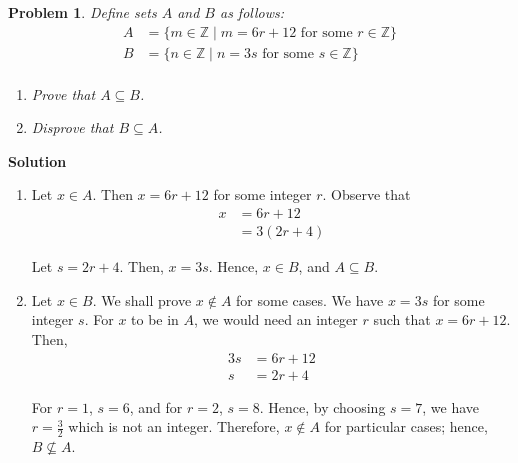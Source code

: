 \documentclass{article}
\newtheorem{problem}{Problem}
\newcommand{\Z}{\mathbb{Z}}
\begin{document}
\begin{problem}
Define sets $A$ and $B$ as follows:
\begin{align*}
A&=\{m \in \Z \mid m=6r+12 \text{ for some } r \in \Z\}\\
B&=\{n \in \Z \mid n=3s \text{ for some } s \in \Z\}\\
\end{align*}

\begin{enumerate}[label=(\alph*)]
\item Prove that $A \subseteq B$.
\item Disprove that $B \subseteq A$.
\end{enumerate}
\end{problem}
\textbf{Solution}
\begin{enumerate}[label=(\alph*)]
\item Let $x \in A$. Then $x=6r+12$ for some integer $r$.
Observe that
\begin{align*}
x&=6r+12\\
&=3(2r+4)
\end{align*}

Let $s=2r+4$. Then, $x=3s$. Hence, $x \in B$, and $A \subseteq B$.
\item Let $x \in B$. We shall prove $x \notin A$ for some cases. We have $x=3s$
for some integer $s$. For $x$ to be in $A$, we would need an integer $r$ such that
$x=6r+12$. Then,
\begin{align*}
3s&=6r+12\\
s&=2r+4
\end{align*}

For $r=1$, $s=6$, and for $r=2$, $s=8$. Hence, by choosing $s=7$, we have
$r=\frac32$ which is not an integer. Therefore, $x \notin A$ for particular cases;
hence, $B \nsubseteq A$.
\end{enumerate}
\end{document}
